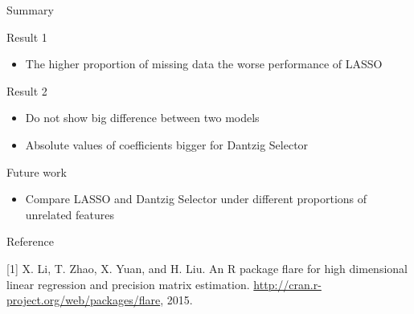 \documentclass[ignorenonframetext,]{beamer}
\providecommand{\tightlist}{%
  \setlength{\itemsep}{0pt}\setlength{\parskip}{0pt}}
\begin{document}
\begin{frame}{Summary}

\begin{block}{Result 1}

\begin{itemize}
\tightlist
\item
  The higher proportion of missing data the worse performance of LASSO
\end{itemize}

\end{block}

\begin{block}{Result 2}

\begin{itemize}
\tightlist
\item
  Do not show big difference between two models
\item
  Absolute values of coefficients bigger for Dantzig Selector
\end{itemize}

\end{block}

\begin{block}{Future work}

\begin{itemize}
\tightlist
\item
  Compare LASSO and Dantzig Selector under different proportions of
  unrelated features
\end{itemize}

\end{block}

\end{frame}

\begin{frame}{Reference}

{[}1{]} X. Li, T. Zhao, X. Yuan, and H. Liu. An R package flare for high
dimensional linear regression and precision matrix estimation.
\url{http://cran.r-project.org/web/packages/flare}, 2015.

\end{frame}
\end{document}
